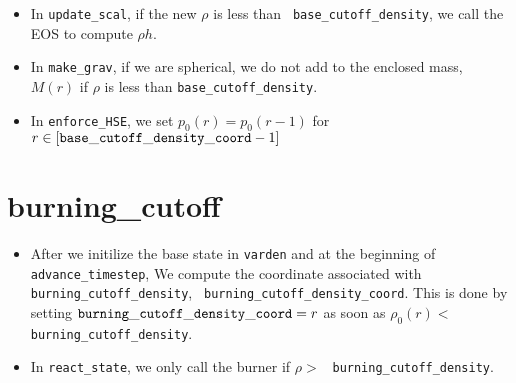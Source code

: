 \begin{itemize}
\item In {\tt update\_scal}, if the new $\rho$ is less than {\tt
  base\_cutoff\_density}, we call the EOS to compute $\rho h$.

\item In {\tt make\_grav}, if we are spherical, we do not add to the
  enclosed mass, $M(r)$ if $\rho$ is less than {\tt base\_cutoff\_density}.

\item In {\tt enforce\_HSE}, we set $p_0(r) = p_0(r-1)$ for 
  $r\in[{\tt base\_cutoff\_density\_coord}-1]$

\end{itemize}

\section{burning\_cutoff}

\begin{itemize}
\item After we initilize the base state in {\tt varden} and at the
  beginning of {\tt advance\_timestep}, We compute the coordinate
  associated with {\tt burning\_cutoff\_density}, {\tt
    burning\_cutoff\_density\_coord}.  This is done by setting ${\tt
    burning\_cutoff\_density\_coord}= r$ as soon as $\rho_0(r) <$ {\tt
    burning\_cutoff\_density}.

\item In {\tt react\_state}, we only call the burner if $\rho >$ {\tt
  burning\_cutoff\_density}.
\end{itemize}

